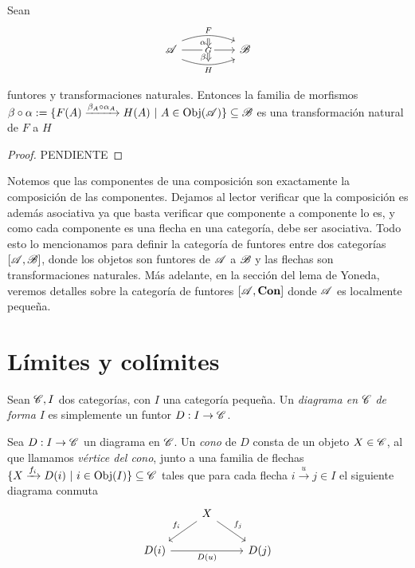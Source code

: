 \documentclass{comunicaciones}
\begin{document}
\begin{prop}
    Sean 
    \[
    \begin{tikzcd}
    \A && \B
    \arrow[""{name=0, anchor=center, inner sep=0}, "F", shift left=2, out=20, in=160, from=1-1, to=1-3]
    \arrow[""{name=1, anchor=center, inner sep=0}, "H"', shift right=2, out=340, in=200, from=1-1, to=1-3]
    \arrow[""{name=2, anchor=center, inner sep=0}, "G"{description}, from=1-1, to=1-3]
    \arrow["\alpha"', shorten <=2pt, shorten >=2pt, Rightarrow, from=0, to=2]
    \arrow["\beta"', shorten <=2pt, shorten >=2pt, Rightarrow, from=2, to=1]
\end{tikzcd}
    \]
    
    funtores y transformaciones naturales. Entonces la familia de morfismos 
    $\beta\circ\alpha:=\{F(A)\xrightarrow{\beta_A\circ\alpha_A}H(A) \ |\ A\in\mathrm{Obj}(\mathscr A)\}\subseteq\mathscr B$
    es una transformación natural de $F$ a $H$
\end{prop}
\begin{proof}
    PENDIENTE
\end{proof}

Notemos que las componentes de una composición son exactamente la composición de las componentes. Dejamos al lector verificar que la composición
es además asociativa ya que basta verificar que componente a componente lo es, y como cada componente es una flecha en una categoría, debe ser asociativa.
Todo esto lo mencionamos para definir la categoría de funtores entre dos categorías $[\mathscr A,\mathscr B]$, donde los objetos son funtores de $\mathscr A$ a $\mathscr B$ y las flechas
son transformaciones naturales. Más adelante, en la sección del lema de Yoneda, veremos detalles sobre la categoría de funtores $[\mathscr A,\mathbf{Con}]$ donde $\mathscr A$ es localmente pequeña.

\section{Límites y colímites}

\begin{dfn}[Diagrama]
    Sean $\mathscr C,I$ dos categorías, con $I$ una categoría pequeña. Un \emph{diagrama en} $\mathscr C$ \emph{de forma} $I$ es simplemente un funtor $D:I\to\mathscr C$.   
\end{dfn}

\begin{dfn}
    Sea $D:I\to\mathscr C$ un diagrama en $\mathscr C$. Un \emph{cono} de $D$ consta de un objeto $X\in\mathscr C$, al que llamamos \emph{vértice del cono}, junto a una familia
    de flechas $\{X\xrightarrow{f_i}D(i) \ |\ i\in\Obj(I)\}\subseteq\C$ tales que para cada flecha $i\xrightarrow{u}j\in I$ el siguiente diagrama conmuta
    \[\begin{tikzcd}
        & X \\
        {D(i)} && {D(j)}
        \arrow["{f_i}"', from=1-2, to=2-1]
        \arrow["{f_j}", from=1-2, to=2-3]
        \arrow["{D(u)}"', from=2-1, to=2-3]
    \end{tikzcd}\]
\end{dfn}
\end{document}
